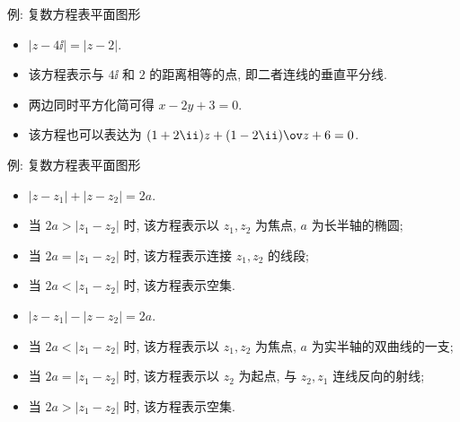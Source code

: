 \begin{frame}{例: 复数方程表平面图形}
	\onslide<+->
	\begin{example}[sidepic,righthand width=3.3cm,leftupper=0mm]
		\begin{itemize}
			\item $|z-4\ii|=|z-2|$.
			\item 该方程表示与 $4\ii$ 和 $2$ 的距离相等的点, 即二者连线的垂直平分线.
			\item 两边同时平方化简可得 $x-2y+3=0$.
			\item 该方程也可以表达为 $(1+2\ii)z+(1-2\ii)\ov z+6=0$.
		\end{itemize}
		\tcblower
	\end{example}
\end{frame}


\begin{frame}{例: 复数方程表平面图形}
	\onslide<+->
	\begin{example}[leftupper=0mm]
		\begin{itemize}
			\item $|z-z_1|+|z-z_2|=2a$.
			\item 当 $2a>|z_1-z_2|$ 时, 该方程表示以 $z_1,z_2$ 为焦点, $a$ 为长半轴的椭圆;
			\item 当 $2a=|z_1-z_2|$ 时, 该方程表示连接 $z_1,z_2$ 的线段;
			\item 当 $2a<|z_1-z_2|$ 时, 该方程表示空集.
		\end{itemize}
	\end{example}
	\onslide<+->
	\begin{example}[leftupper=0mm]
		\begin{itemize}
			\item $|z-z_1|-|z-z_2|=2a$.
			\item 当 $2a<|z_1-z_2|$ 时, 该方程表示以 $z_1,z_2$ 为焦点, $a$ 为实半轴的双曲线的一支;
			\item 当 $2a=|z_1-z_2|$ 时, 该方程表示以 $z_2$ 为起点, 与 $z_2,z_1$ 连线反向的射线;
			\item 当 $2a>|z_1-z_2|$ 时, 该方程表示空集.	
		\end{itemize}
	\end{example}
\end{frame}


